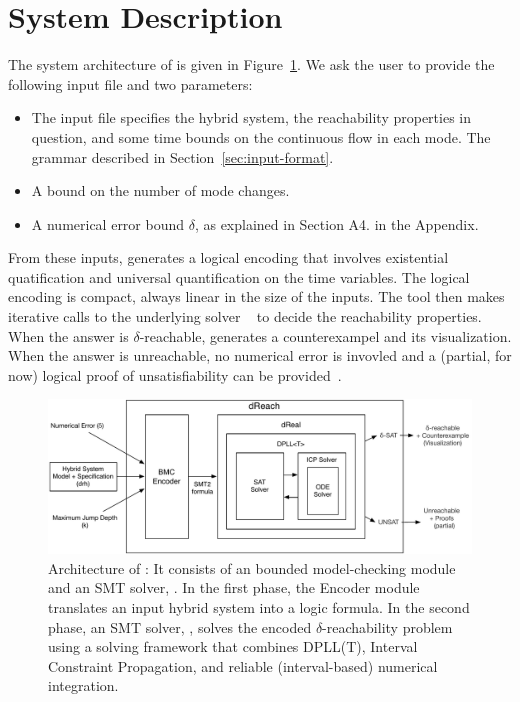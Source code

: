 \section{System Description}\label{sec:system}
The system architecture of \dReach{} is given in Figure~\ref{sec:system}. We ask the user to provide the following input file and two parameters:
\begin{itemize}
\item The input file specifies the hybrid system, the reachability
  properties in question, and some time bounds on the continuous flow in each mode.
  The grammar described in
  Section~\ref{sec:input-format}.
\item A bound on the number of mode changes.
\item A numerical error bound $\delta$, as explained in Section A4. in the Appendix.
\end{itemize}
From these inputs, \dReach{} generates a logical encoding that involves existential quatification and universal quantification on the time variables. The logical encoding is compact, always linear in the size of the inputs. The tool then makes iterative calls to the underlying solver \dReal{}~\cite{DBLP:conf/cade/GaoKC13} to decide the reachability properties. When the answer is {\sf $\delta$-reachable}, \dReach{} generates a counterexampel and its visualization. When the answer is {\sf unreachable}, no numerical error is invovled and a (partial, for now) logical proof of unsatisfiability can be provided~\cite{SYNASC14}.
\begin{figure}[!h]
  \centering
  \includegraphics[width=\textwidth]{images/dreach_archi}
  \caption{Architecture of \dReach{}: It consists of an bounded
    model-checking module and an SMT solver, \dReal{}. In the first
    phase, the Encoder module translates an input hybrid system into a
    logic formula. In the second phase, an
    SMT solver, \dReal{}, solves the encoded $\delta$-reachability
    problem using a solving framework that combines DPLL(T), Interval Constraint Propagation, and reliable (interval-based) numerical integration.
  }\label{fig:system-description}
\end{figure}



